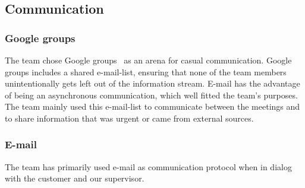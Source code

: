 \subsection{Communication}
\subsubsection{Google groups}
The team chose Google groups~\cite{ggroups} as an arena for casual communication. Google groups includes a shared e-mail-list, ensuring that none of the team members unintentionally gets left out of the information stream. E-mail has the advantage of being an asynchronous communication, which well fitted the team's purposes. The team mainly used this e-mail-list to communicate between the meetings and to share information that was urgent or came from external sources. 

\subsubsection{E-mail}
The team has primarily used e-mail as communication protocol when in dialog with the customer and our supervisor.